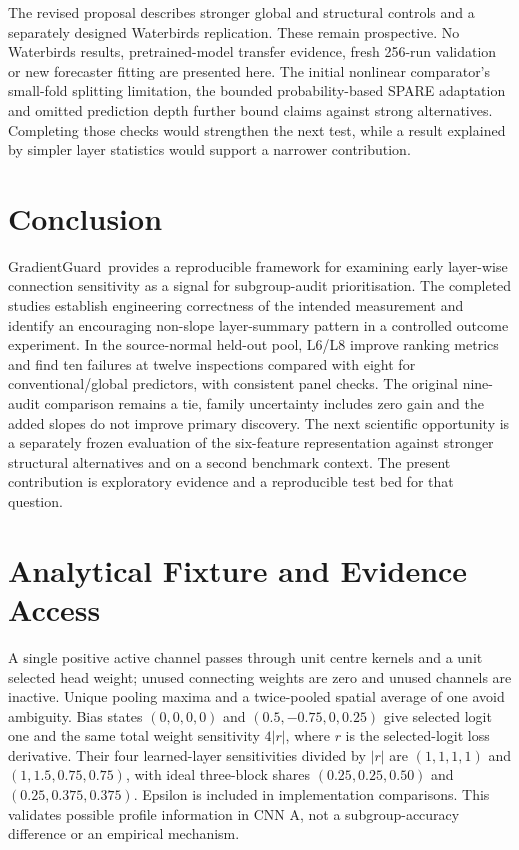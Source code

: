 \documentclass[nolineno]{ieeeaccess}
\newcommand{\GG}{GradientGuard}
\begin{document}
The revised proposal describes stronger global and structural controls and a separately designed Waterbirds replication. These remain prospective. No Waterbirds results, pretrained-model transfer evidence, fresh 256-run validation or new forecaster fitting are presented here. The initial nonlinear comparator's small-fold splitting limitation, the bounded probability-based SPARE adaptation and omitted prediction depth further bound claims against strong alternatives. Completing those checks would strengthen the next test, while a result explained by simpler layer statistics would support a narrower contribution.

\section{Conclusion}
\GG\ provides a reproducible framework for examining early layer-wise connection sensitivity as a signal for subgroup-audit prioritisation. The completed studies establish engineering correctness of the intended measurement and identify an encouraging non-slope layer-summary pattern in a controlled outcome experiment. In the source-normal held-out pool, L6/L8 improve ranking metrics and find ten failures at twelve inspections compared with eight for conventional/global predictors, with consistent panel checks. The original nine-audit comparison remains a tie, family uncertainty includes zero gain and the added slopes do not improve primary discovery. The next scientific opportunity is a separately frozen evaluation of the six-feature representation against stronger structural alternatives and on a second benchmark context. The present contribution is exploratory evidence and a reproducible test bed for that question.

\appendices
\section{Analytical Fixture and Evidence Access}
\label{app:fixture}
A single positive active channel passes through unit centre kernels and a unit selected head weight; unused connecting weights are zero and unused channels are inactive. Unique pooling maxima and a twice-pooled spatial average of one avoid ambiguity. Bias states $(0,0,0,0)$ and $(0.5,-0.75,0,0.25)$ give selected logit one and the same total weight sensitivity $4|r|$, where $r$ is the selected-logit loss derivative. Their four learned-layer sensitivities divided by $|r|$ are $(1,1,1,1)$ and $(1,1.5,0.75,0.75)$, with ideal three-block shares $(0.25,0.25,0.50)$ and $(0.25,0.375,0.375)$. Epsilon is included in implementation comparisons. This validates possible profile information in CNN A, not a subgroup-accuracy difference or an empirical mechanism.
\end{document}
